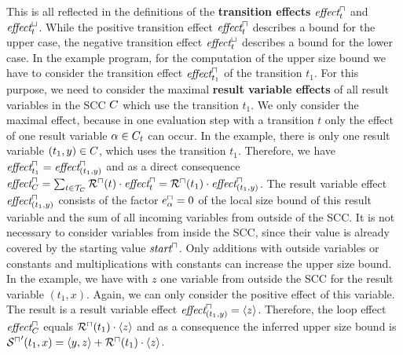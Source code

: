 \begin{example}
  This is all reflected in the definitions of the \textbf{transition effects} $\emph{effect}^\sqcap_t$ and $\emph{effect}^\sqcup_t$.
  While the positive transition effect $\emph{effect}^\sqcap_t$ describes a bound for the upper case, the negative transition effect $\emph{effect}^\sqcup_t$ describes a bound for the lower case.
  In the example program, for the computation of the upper size bound we have to consider the transition effect $\emph{effect}^\sqcap_{t_1}$ of the transition $t_1$.
  For this purpose, we need to consider the maximal \textbf{result variable effects} of all result variables in the SCC $C$ which use the transition $t_1$.
  We only consider the maximal effect, because in one evaluation step with a transition $t$ only the effect of one result variable $\alpha \in C_t$ can occur.
  In the example, there is only one result variable $(t_1,y) \in C$, which uses the transition $t_1$.
  Therefore, we have $\emph{effect}^\sqcap_{t_1} = \emph{effect}^\sqcap_{(t_1,y)}$ and as a direct consequence $\emph{effect}^\sqcap_C = \sum_{t \in \mathcal{T}_C} {\mathcal{R}^\sqcap}(t) \cdot \emph{effect}^\sqcap_{t} = {\mathcal{R}^\sqcap}(t_1) \cdot \emph{effect}^\sqcap_{(t_1,y)}$.
  The result variable effect $\emph{effect}^\sqcap_{(t_1,y)}$ consists of the factor $e^\sqcap_\alpha = 0$ of the local size bound of this result variable and the sum of all incoming variables from outside of the SCC.
  It is not necessary to consider variables from inside the SCC, since their value is already covered by the starting value $\emph{start}^\sqcap$.
  Only additions with outside variables or constants and multiplications with constants can increase the upper size bound.
  In the example, we have with $z$ one variable from outside the SCC for the result variable $(t_1,x)$.
  Again, we can only consider the positive effect of this variable.
  The result is a result variable effect $\emph{effect}^\sqcap_{(t_1,y)} = \langle z\rangle$.
  Therefore, the loop effect $\emph{effect}^\sqcap_C$ equals ${\mathcal{R}^\sqcap}(t_1) \cdot \langle z\rangle$ and as a consequence the inferred upper size bound is ${\mathcal{S}^\sqcap}'(t_1,x) = \langle y,z\rangle + {\mathcal{R}^\sqcap}(t_1) \cdot \langle z\rangle$.
\end{example}
